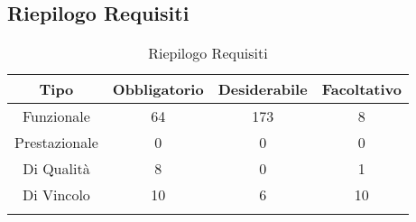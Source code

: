 \subsection{Riepilogo Requisiti}
\normalsize
\begin{longtable}{|c|c|c|c|}
\hline 
\textbf{Tipo} & \textbf{Obbligatorio} & \textbf{Desiderabile} & \textbf{Facoltativo}\\
\hline
Funzionale & 64 & 173 & 8\\ \hline
Prestazionale & 0 & 0 & 0\\ \hline
Di Qualità & 8 & 0 & 1\\ \hline
Di Vincolo & 10 & 6 & 10\\ \hline
\caption[Riepilogo Requisiti]{Riepilogo Requisiti}
\label{tabella:riepilogorequi}
\end{longtable}
\clearpage
